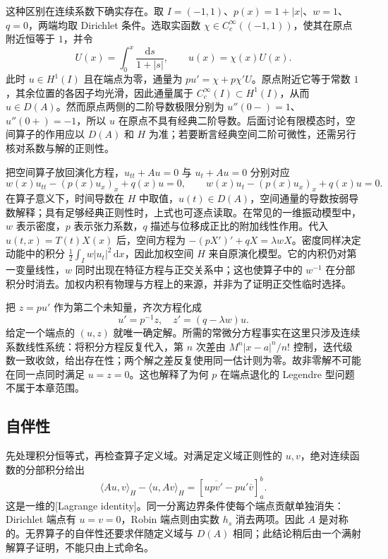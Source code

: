 \ProseParagraphBreak

这种区别在连续系数下确实存在。取 \(I=(-1,1)\)、\(p(x)=1+|x|\)、\(w=1\)、\(q=0\)，两端均取 Dirichlet 条件。选取实函数 \(\chi\in C_c^\infty((-1,1))\)，使其在原点附近恒等于 \(1\)，并令
\[
 U(x)=\int_0^x\frac{\mathrm{d}s}{1+|s|},\qquad u(x)=\chi(x)U(x).
\]
此时 \(u\in H^1(I)\) 且在端点为零，通量为 \(pu'=\chi+p\chi'U\)。原点附近它等于常数 \(1\)，其余位置的各因子均光滑，因此通量属于 \(C_c^\infty(I)\subset H^1(I)\)，从而 \(u\in D(A)\)。然而原点两侧的二阶导数极限分别为 \(u''(0-)=1\)、\(u''(0+)=-1\)，所以 \(u\) 在原点不具有经典二阶导数。后面讨论有限模态时，空间算子的作用应以 \(D(A)\) 和 \(H\) 为准；若要断言经典空间二阶可微性，还需另行核对系数与解的正则性。

\ProseParagraphBreak

把空间算子放回演化方程，\(u_{tt}+Au=0\) 与 \(u_t+Au=0\) 分别对应
\[
 w(x)u_{tt}-(p(x)u_x)_x+q(x)u=0,
 \qquad
 w(x)u_t-(p(x)u_x)_x+q(x)u=0.
\]
在算子意义下，时间导数在 \(H\) 中取值，\(u(t)\in D(A)\)，空间通量的导数按弱导数解释；具有足够经典正则性时，上式也可逐点读取。在常见的一维振动模型中，\(w\) 表示密度，\(p\) 表示张力系数，\(q\) 描述与位移成正比的附加线性作用。代入 \(u(t,x)=T(t)X(x)\) 后，空间方程为 \(-(pX')'+qX=\lambda wX\)。密度同样决定动能中的积分 \(\frac12\int_I w|u_t|^2\,\mathrm{d}x\)，因此加权空间 \(H\) 来自原演化模型。它的内积仍对第一变量线性，\(w\) 同时出现在特征方程与正交关系中；这也使算子中的 \(w^{-1}\) 在分部积分时消去。加权内积有物理与方程上的来源，并非为了证明正交性临时选择。

\ProseParagraphBreak

把 \(z=pu'\) 作为第二个未知量，齐次方程化成
\begin{equation}\label{b2:eq:10-first-order-system}
 u'=p^{-1}z,
 \quad z'=(q-\lambda w)u.
\end{equation}
给定一个端点的 \((u,z)\) 就唯一确定解。所需的常微分方程事实在这里只涉及连续系数线性系统：将积分方程反复代入，第 \(n\) 次差由 \(M^n|x-a|^n/n!\) 控制，迭代级数一致收敛，给出存在性；两个解之差反复使用同一估计则为零。故非零解不可能在同一点同时满足 \(u=z=0\)。这也解释了为何 \(p\) 在端点退化的 Legendre 型问题不属于本章范围。

\subsection{自伴性}
\label{b2:subsec:100202}

先处理积分恒等式，再检查算子定义域。对满足定义域正则性的 \(u,v\)，绝对连续函数的分部积分给出
\begin{equation}\label{b2:eq:10-lagrange-identity}
 \langle Au,v\rangle_H-\langle u,Av\rangle_H
 =\left[u\overline{pv'}-pu'\overline v\right]_a^b.
\end{equation}
这是一维的[Lagrange identity]。同一分离边界条件使每个端点贡献单独消失：Dirichlet 端点有 \(u=v=0\)，Robin 端点则由实数 \(h_s\) 消去两项。因此 \(A\) 是对称的。无界算子的自伴性还要求伴随定义域与 \(D(A)\) 相同；此结论稍后由一个满射解算子证明，不能只由上式命名。

